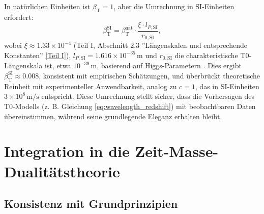 \documentclass[12pt,a4paper]{article}
\newcommand{\betaT}{\beta_{\text{T}}}
\begin{document}
	In natürlichen Einheiten ist \(\betaT = 1\), aber die Umrechnung in SI-Einheiten erfordert:
	\begin{equation}
		\betaT^{\text{SI}} = \betaT^{\text{nat}} \cdot \frac{\xi \cdot l_{P,\text{SI}}}{r_{0,\text{SI}}},
		\label{eq:beta_conversion}
	\end{equation}
	wobei \(\xi \approx 1.33 \times 10^{-4}\) (Teil I, Abschnitt 2.3 ''Längenskalen und entsprechende Konstanten'' \href{https://github.com/jpascher/T0-Time-Mass-Duality/tree/main/2/pdf/Deutsch/Bridging Quantum Mechanics and Relativity through Time-Mass Duality Part I Theoretical Foundations.pdf}{[Teil I]}), \(l_{P,\text{SI}} = 1.616 \times 10^{-35} \, \text{m}\) und \(r_{0,\text{SI}}\) die charakteristische T0-Längenskala ist, etwa \(10^{-39} \, \text{m}\), basierend auf Higgs-Parametern \cite{pascher_alphabeta_2025}. Dies ergibt \(\betaT^{\text{SI}} \approx 0.008\), konsistent mit empirischen Schätzungen, und überbrückt theoretische Reinheit mit experimenteller Anwendbarkeit, analog zu \(c = 1\), das in SI-Einheiten \(3 \times 10^8 \, \text{m/s}\) entspricht. Diese Umrechnung stellt sicher, dass die Vorhersagen des T0-Modells (z. B. Gleichung \ref{eq:wavelength_redshift}) mit beobachtbaren Daten übereinstimmen, während seine grundlegende Eleganz erhalten bleibt.
	
	\section{Integration in die Zeit-Masse-Dualitätstheorie}
	\label{sec:integration_t0}
	
	\subsection{Konsistenz mit Grundprinzipien}
	\label{subsec:consistency_principles}
	
\end{document}

